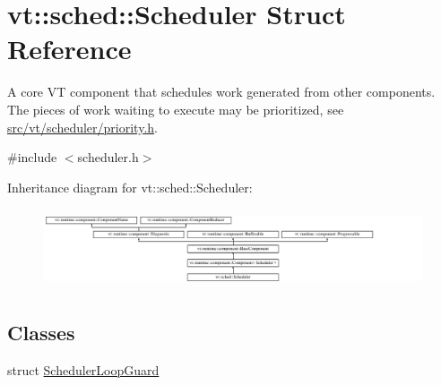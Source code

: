 \hypertarget{structvt_1_1sched_1_1_scheduler}{}\section{vt\+:\+:sched\+:\+:Scheduler Struct Reference}
\label{structvt_1_1sched_1_1_scheduler}


A core VT component that schedules work generated from other components. The pieces of work waiting to execute may be prioritized, see \hyperlink{priority_8h}{src/vt/scheduler/priority.\+h}.  




{\ttfamily \#include $<$scheduler.\+h$>$}

Inheritance diagram for vt\+:\+:sched\+:\+:Scheduler\+:\begin{figure}[H]
\begin{center}
\leavevmode
\includegraphics[height=2.372881cm]{structvt_1_1sched_1_1_scheduler}
\end{center}
\end{figure}
\subsection*{Classes}
\begin{DoxyCompactItemize}
\item 
struct \hyperlink{structvt_1_1sched_1_1_scheduler_1_1_scheduler_loop_guard}{Scheduler\+Loop\+Guard}
\end{DoxyCompactItemize}
